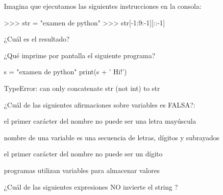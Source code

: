 \begin{ejercicio} Imagina que ejecutamos las siguientes instrucciones en la consola:

\begin{python}
>>> str = "examen de python"
>>> str[-1:9:-1][::-1]
\end{python}

¿Cuál es el resultado?


\begin{choices}
    \choice {}   %
    \choice {}
   \choice {}
    \choice {}
\end{choices}
\end{ejercicio}
\newpage

\begin{ejercicio} ¿Qué imprime por pantalla el siguiente programa?
 
\begin{python}
s = "examen de python"
print(s + ' Hi!')
\end{python}

\begin{choices}
    \choice {}   %
    \choice {}
   \choice TypeError: can only concatenate str (not int) to str
    \choice {}
\end{choices}


\end{ejercicio}


\begin{ejercicio} ¿Cuál de las siguientes afirmaciones sobre variables es FALSA?:

\begin{choices}
 \choice el primer carácter del nombre no puede ser una letra mayúscula   %
 
\choice nombre de una variable es una secuencia de letras, dígitos y subrayados

\choice el primer carácter del nombre no puede ser un dígito

\choice  programas utilizan variables para almacenar valores
 
 \end{choices}     



\end{ejercicio}


\begin{ejercicio} 
¿Cuál de las siguientes expresiones NO invierte el string  ?

\begin{choices}
    \choice  {}   %
    \choice  {}
    \choice  {}
    \choice  {}
\end{choices}
\end{ejercicio}


